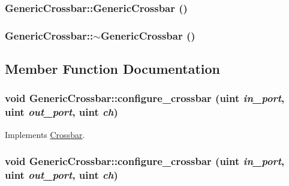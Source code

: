 \hypertarget{classGenericCrossbar_4a686c329c66490d847cc938b7e02aae}{
\subsubsection[{GenericCrossbar}]{\setlength{\rightskip}{0pt plus 5cm}GenericCrossbar::GenericCrossbar ()}}
\label{classGenericCrossbar_4a686c329c66490d847cc938b7e02aae}


\hypertarget{classGenericCrossbar_53c13d3c966feb35331958f7a2f9f90c}{
\subsubsection[{$\sim$GenericCrossbar}]{\setlength{\rightskip}{0pt plus 5cm}GenericCrossbar::$\sim$GenericCrossbar ()}}
\label{classGenericCrossbar_53c13d3c966feb35331958f7a2f9f90c}




\subsection{Member Function Documentation}
\hypertarget{classGenericCrossbar_50c8203133960f74f6d82649b0c864be}{
\subsubsection[{configure\_\-crossbar}]{\setlength{\rightskip}{0pt plus 5cm}void GenericCrossbar::configure\_\-crossbar ({\bf uint} {\em in\_\-port}, \/  {\bf uint} {\em out\_\-port}, \/  {\bf uint} {\em ch})}}
\label{classGenericCrossbar_50c8203133960f74f6d82649b0c864be}




Implements \hyperlink{classCrossbar_8a7a059788ee336f171eb1d3c7be3110}{Crossbar}.\hypertarget{classGenericCrossbar_50c8203133960f74f6d82649b0c864be}{
\subsubsection[{configure\_\-crossbar}]{\setlength{\rightskip}{0pt plus 5cm}void GenericCrossbar::configure\_\-crossbar ({\bf uint} {\em in\_\-port}, \/  {\bf uint} {\em out\_\-port}, \/  {\bf uint} {\em ch})}}
\label{classGenericCrossbar_50c8203133960f74f6d82649b0c864be}




